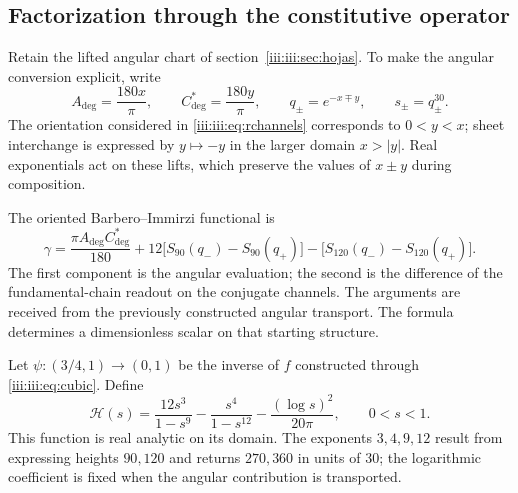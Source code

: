 \subsection{Factorization through the constitutive operator}

Retain the lifted angular chart of
section~\ref{iii:iii:sec:hojas}. To make the angular conversion explicit,
write
\begin{equation}
 A_{\deg}=\frac{180x}{\pi},\qquad
 C^*_{\deg}=\frac{180y}{\pi},\qquad
 q_\pm=e^{-x\mp y},\qquad s_\pm=q_\pm^{30}.
 \label{iii:iii:eq:barbero-angular-lift}
\end{equation}
The orientation considered in \eqref{iii:iii:eq:rchannels} corresponds to
$0<y<x$; sheet interchange is expressed by $y\mapsto-y$ in the
larger domain $x>|y|$. Real exponentials act on these
lifts, which preserve the values of $x\pm y$ during
composition.

The oriented Barbero--Immirzi functional is
\begin{equation}
 \gamma=\frac{\pi A_{\deg}C^*_{\deg}}{180}
   +12\bigl[S_{90}(q_-)-S_{90}(q_+)\bigr]
   -\bigl[S_{120}(q_-)-S_{120}(q_+)\bigr].
 \label{iii:iii:eq:barbero-functional}
\end{equation}
The first component is the angular evaluation; the second is the
difference of the fundamental-chain readout on the conjugate channels.
The arguments are received from the previously constructed angular transport.
The formula determines a dimensionless scalar on that starting
structure.

Let $\psi:(3/4,1)\to(0,1)$ be the inverse of $f$ constructed through
\eqref{iii:iii:eq:cubic}. Define
\begin{equation}
 \mathcal H(s)=\frac{12s^3}{1-s^9}
             -\frac{s^4}{1-s^{12}}
             -\frac{(\log s)^2}{20\pi},\qquad 0<s<1.
 \label{iii:iii:eq:barbero-h}
\end{equation}
This function is real analytic on its domain. The exponents $3,4,9,12$
result from expressing heights $90,120$ and returns $270,360$ in
units of $30$; the logarithmic coefficient is fixed when
the angular contribution is transported.

